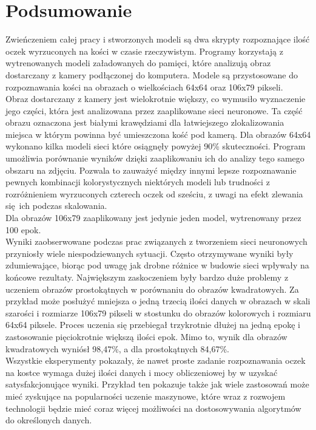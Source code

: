 
\chapter{Podsumowanie}

Zwieńczeniem całej pracy i stworzonych modeli są dwa skrypty rozpoznające ilość
oczek wyrzuconych na kości w czasie rzeczywistym. Programy korzystają z wytrenowanych
modeli załadowanych do pamięci, które analizują obraz dostarczany z kamery
podłączonej do komputera. Modele są przystosowane do rozpoznawania kości na
obrazach o wielkościach 64x64 oraz 106x79 pikseli.\\
Obraz dostarczany z kamery jest wielokrotnie większy, co wymusiło wyznaczenie jego
części, która jest analizowana przez zaaplikowane sieci neuronowe. Ta część obrazu
oznaczona jest białymi krawędziami dla łatwiejszego zlokalizowania miejsca w którym
powinna być umieszczona kość pod kamerą.
Dla obrazów 64x64 wykonano kilka modeli sieci które osiągnęły powyżej 90\% skuteczności.
Program umożliwia porównanie wyników dzięki zaaplikowaniu ich do analizy tego
samego obszaru na zdjęciu. Pozwala to zauważyć między innymi lepsze rozpoznawanie
pewnych kombinacji kolorystycznych niektórych modeli lub trudności z rozróżnieniem
wyrzuconych czterech oczek od sześciu, z uwagi na efekt zlewania się ich podczas
skalowania.\\
Dla obrazów 106x79 zaaplikowany jest jedynie jeden model, wytrenowany przez 100 epok.\\
Wyniki zaobserwowane podczas prac związanych z tworzeniem sieci neuronowych przyniosły
wiele niespodziewanych sytuacji. Często otrzymywane wyniki były zdumiewające,
biorąc pod uwagę jak drobne różnice w budowie sieci wpływały na końcowe rezultaty.
Największym zaskoczeniem były bardzo duże problemy z uczeniem obrazów prostokątnych w
porównaniu do obrazów kwadratowych. Za przykład może posłużyć mniejsza o jedną trzecią
ilości danych w obrazach w skali szarości i rozmiarze 106x79 pikseli w stostunku do
obrazów kolorowych i rozmiaru 64x64 piksele. Proces uczenia się przebiegał trzykrotnie
dłużej na jedną epokę i zastosowanie pięciokrotnie większą ilości epok. Mimo to, wynik
dla obrazów kwadratowych wyniósł 98,47\%, a dla prostokątnych 84,67\%.\\
Wszystkie eksperymenty pokazały, że nawet proste zadanie rozpoznawania oczek na kostce
wymaga dużej ilości danych i mocy obliczeniowej by w uzyskać satysfakcjonujące wyniki.
Przykład ten pokazuje także jak wiele zastosowań może mieć zyskujące na popularności
uczenie maszynowe, które wraz z rozwojem technologii będzie mieć coraz więcej możliwości
na dostosowywania algorytmów do określonych danych.
